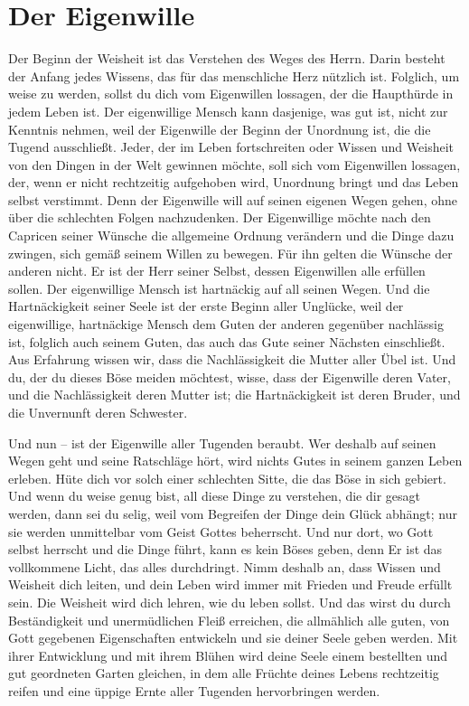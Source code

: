 
	\chapter{Der Eigenwille}



Der Beginn der Weisheit ist das Verstehen des Weges des Herrn. Darin besteht der Anfang jedes Wissens, das für das menschliche Herz nützlich ist. Folglich, um weise zu werden, sollst du dich vom Eigenwillen lossagen, der die Haupthürde in jedem Leben ist. Der eigenwillige Mensch kann dasjenige, was gut ist, nicht zur Kenntnis nehmen, weil der Eigenwille der Beginn der Unordnung ist, die die Tugend ausschließt. Jeder, der im Leben fortschreiten oder Wissen und Weisheit von den Dingen in der Welt gewinnen möchte, soll sich vom Eigenwillen lossagen, der, wenn er nicht rechtzeitig aufgehoben wird, Unordnung bringt und das Leben selbst verstimmt. Denn der Eigenwille will auf seinen eigenen Wegen gehen, ohne über die schlechten Folgen nachzudenken. Der Eigenwillige möchte nach den Capricen seiner Wünsche die allgemeine Ordnung verändern und die Dinge dazu zwingen, sich gemäß seinem Willen zu bewegen. Für ihn gelten die Wünsche der anderen nicht. Er ist der Herr seiner Selbst, dessen Eigenwillen alle erfüllen sollen. Der eigenwillige Mensch ist hartnäckig auf all seinen Wegen. Und die Hartnäckigkeit seiner Seele ist der erste Beginn aller Unglücke, weil der eigenwillige, hartnäckige Mensch dem Guten der anderen gegenüber nachlässig ist, folglich auch seinem Guten, das auch das Gute seiner Nächsten einschließt. Aus Erfahrung wissen wir, dass die Nachlässigkeit die Mutter aller Übel ist. Und du, der du dieses Böse meiden möchtest, wisse, dass der Eigenwille deren Vater, und die Nachlässigkeit deren Mutter ist; die Hartnäckigkeit ist deren Bruder, und die Unvernunft deren Schwester. 

Und nun -- ist der Eigenwille aller Tugenden beraubt. Wer deshalb auf seinen Wegen geht und seine Ratschläge hört, wird nichts Gutes in seinem ganzen Leben erleben. Hüte dich vor solch einer schlechten Sitte, die das Böse in sich gebiert. Und wenn du weise genug bist, all diese Dinge zu verstehen, die dir gesagt werden, dann sei du selig, weil vom Begreifen der Dinge dein Glück abhängt; nur sie werden unmittelbar vom Geist Gottes beherrscht. Und nur dort, wo Gott selbst herrscht und die Dinge führt, kann es kein Böses geben, denn Er ist das vollkommene Licht, das alles durchdringt. Nimm deshalb an, dass Wissen und Weisheit dich leiten, und dein Leben wird immer mit Frieden und Freude erfüllt sein. Die Weisheit wird dich lehren, wie du leben sollst. Und das wirst du durch Beständigkeit und unermüdlichen Fleiß erreichen, die allmählich alle guten, von Gott gegebenen Eigenschaften entwickeln und sie deiner Seele geben werden. Mit ihrer Entwicklung und mit ihrem Blühen wird deine Seele einem bestellten und gut geordneten Garten gleichen, in dem alle Früchte deines Lebens rechtzeitig reifen und eine üppige Ernte aller Tugenden hervorbringen werden.

